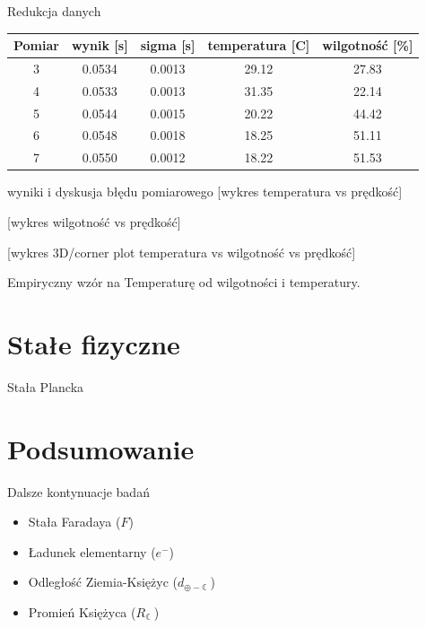 \documentclass{beamer}
\begin{document}
\begin{frame}{Redukcja danych}
\centering
\begin{tabular}{ccccc}
\toprule
Pomiar & wynik [s] & sigma [s] & temperatura [C] & wilgotność [\%] \\
\midrule
3 & 0.0534 & 0.0013 & 29.12 & 27.83 \\
4 & 0.0533 & 0.0013 & 31.35 & 22.14 \\
5 & 0.0544 & 0.0015 & 20.22 & 44.42 \\
6 & 0.0548 & 0.0018 & 18.25 & 51.11 \\
7 & 0.0550 & 0.0012  & 18.22 & 51.53 \\
\bottomrule
\end{tabular}


\end{frame}

\begin{frame}{wyniki i dyskusja błędu pomiarowego}
[wykres temperatura vs prędkość]

[wykres wilgotność vs prędkość]

[wykres 3D/corner plot temperatura vs wilgotność vs prędkość]

Empiryczny wzór na Temperaturę od wilgotności i temperatury.
\end{frame}


\section{Stałe fizyczne}

\begin{frame}{Stała Plancka}

\end{frame}


\section{Podsumowanie}

\begin{frame}{Dalsze kontynuacje badań}
\begin{itemize}
\item Stała Faradaya ($F$)
\item Ładunek elementarny ($e^-$)
\item Odległość Ziemia-Księżyc ($d_{\oplus - \leftmoon}$)
\item Promień Księżyca ($R_{\leftmoon}$)
\end{itemize}

\end{frame}
\end{document}
